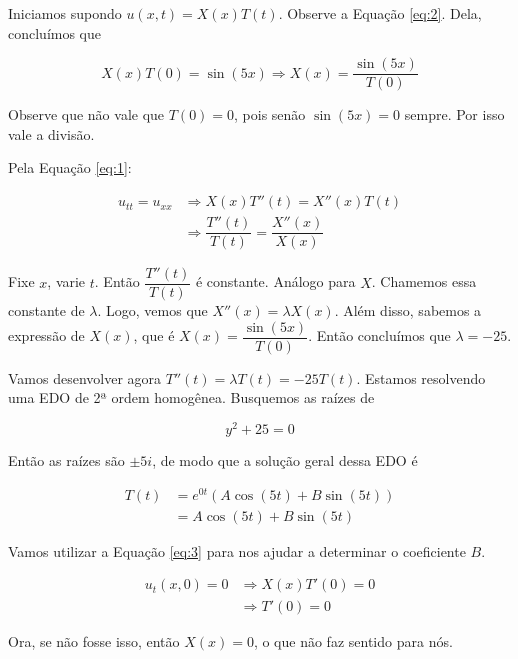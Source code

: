 \documentclass{article}
\begin{document}
\begin{enumerate}
                Iniciamos supondo $u(x, t) = X(x) T(t)$.
                Observe a Equação \ref{eq:2}. Dela, concluímos que

                $$X(x)T(0) = \sin(5x) \Rightarrow X(x) = \dfrac{\sin(5x)}{T(0)}$$

                Observe que não vale que $T(0) = 0$, pois senão $\sin(5x) = 0$ sempre.
                Por isso vale a divisão.

                Pela Equação \ref{eq:1}:

                \begin{align*}
                    u_{tt} = u_{xx} &\Rightarrow X(x)T''(t) = X''(x)T(t) \\
                    &\Rightarrow \dfrac{T''(t)}{T(t)} = \dfrac{X''(x)}{X(x)}
                \end{align*}

                Fixe $x$, varie $t$. Então $\dfrac{T''(t)}{T(t)}$ é constante.
                Análogo para $X$. Chamemos essa constante de $\lambda$.
                Logo, vemos que $X''(x) = \lambda X(x)$. Além disso, sabemos a expressão de $X(x)$,
                que é $X(x) = \dfrac{\sin(5x)}{T(0)}$.
                Então concluímos que $\lambda = -25$.

                Vamos desenvolver agora $T''(t) = \lambda T(t) = -25 T(t)$.
                Estamos resolvendo uma EDO de 2ª ordem homogênea. Busquemos as raízes de

                $$y^2+25 = 0$$

                Então as raízes são $\pm 5i$, de modo que a solução geral dessa EDO é

                \begin{align*}
                    T(t) &= e^{0t} (A \cos(5t) + B\sin(5t)) \\
                    &= A \cos(5t) + B\sin(5t)
                \end{align*}

                Vamos utilizar a Equação \ref{eq:3} para nos ajudar a determinar o coeficiente $B$.
                
                \begin{align*}
                    u_t(x, 0) = 0 &\Rightarrow X(x) T'(0) = 0 \\
                    &\Rightarrow T'(0) = 0
                \end{align*}

                Ora, se não fosse isso, então $X(x) = 0$, o que não faz sentido para nós.


\end{enumerate}
\end{document}
